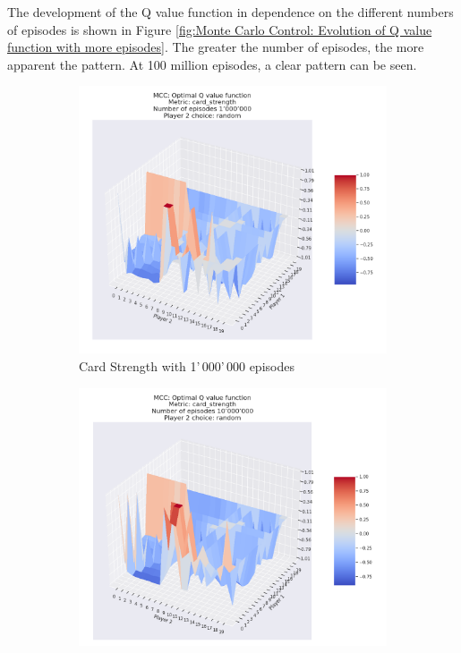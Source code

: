 The development of the Q value function in dependence on the different numbers of episodes is shown in Figure \ref{fig:Monte Carlo Control: Evolution of Q value function with more episodes}. The greater the number of episodes, the more apparent the pattern. At 100 million episodes, a clear pattern can be seen. \\

\begin{figure}[ht!]
    \begin{subfigure}{0.5\textwidth}
        \includegraphics[width=1\linewidth]{Figures/mcc_card_strength_1000000_random} 
        \caption[Card Strength with 1'\,000'\,000 episodes]{Card Strength with 1'\,000'\,000 episodes}
        \label{fig:mcc1}
    \end{subfigure}
    \begin{subfigure}{0.5\textwidth}
        \includegraphics[width=1\linewidth]{Figures/mcc_card_strength_10000000_random}

\end{subfigure}
\end{figure}
